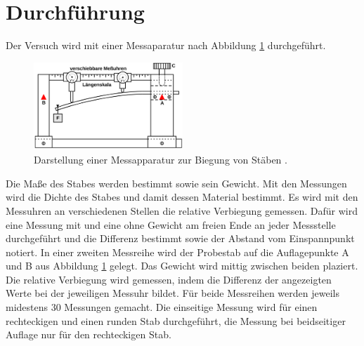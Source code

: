 \section{Durchführung}
\label{sec:Durchführung}
Der Versuch wird mit einer Messaparatur nach Abbildung \ref{fig:Messapparatur}
durchgeführt.
\begin{figure}[H]
  \centering
  \includegraphics[width=0.5\textwidth]{Messapparatur.png}
  \caption{Darstellung einer Messapparatur zur Biegung von Stäben \cite{sample} .}
  \label{fig:Messapparatur}
\end{figure}
Die Maße des Stabes werden bestimmt sowie sein Gewicht. Mit den Messungen wird die
Dichte des Stabes und damit dessen Material bestimmt. Es wird mit den Messuhren
an verschiedenen Stellen die relative Verbiegung gemessen. Dafür wird
eine Messung mit und eine ohne Gewicht am freien Ende an jeder Messstelle
durchgeführt und die Differenz bestimmt sowie der Abstand vom Einspannpunkt notiert.
In einer zweiten Messreihe wird der Probestab auf die Auflagepunkte A und B aus
Abbildung \ref{fig:Messapparatur} gelegt. Das Gewicht wird mittig zwischen beiden
plaziert. Die relative Verbiegung wird gemessen, indem die Differenz der angezeigten
Werte bei der jeweiligen Messuhr bildet. Für beide Messreihen werden jeweils midestens
30 Messungen gemacht. Die einseitige Messung wird für einen rechteckigen und einen
runden Stab durchgeführt, die Messung bei beidseitiger Auflage nur für den
rechteckigen Stab.
